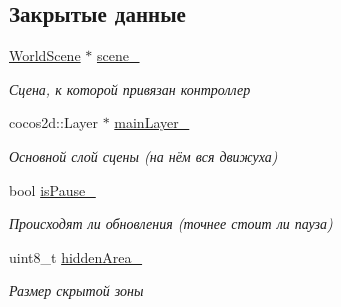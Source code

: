 \subsection*{Закрытые данные}
\begin{DoxyCompactItemize}
\item 
\mbox{\label{classrtm_1_1_world_controller_ae40cf27e88b9916d7b3d2cac35c0dcf8}} 
\hyperlink{classrtm_1_1_world_scene}{World\+Scene} $\ast$ \hyperlink{classrtm_1_1_world_controller_ae40cf27e88b9916d7b3d2cac35c0dcf8}{scene\+\_\+}
\begin{DoxyCompactList}\small\item\em Сцена, к которой привязан контроллер \end{DoxyCompactList}\item 
\mbox{\label{classrtm_1_1_world_controller_a3ef20fc54308d60f9700525dd79efa41}} 
cocos2d\+::\+Layer $\ast$ \hyperlink{classrtm_1_1_world_controller_a3ef20fc54308d60f9700525dd79efa41}{main\+Layer\+\_\+}
\begin{DoxyCompactList}\small\item\em Основной слой сцены (на нём вся движуха) \end{DoxyCompactList}\item 
\mbox{\label{classrtm_1_1_world_controller_ac87ad7a14e099eb1234ca09bc0bd6c21}} 
bool \hyperlink{classrtm_1_1_world_controller_ac87ad7a14e099eb1234ca09bc0bd6c21}{is\+Pause\+\_\+}
\begin{DoxyCompactList}\small\item\em Происходят ли обновления (точнее стоит ли пауза) \end{DoxyCompactList}\item 
\mbox{\label{classrtm_1_1_world_controller_ae1a38ec061ab1a7957c627a3bba63469}} 
uint8\+\_\+t \hyperlink{classrtm_1_1_world_controller_ae1a38ec061ab1a7957c627a3bba63469}{hidden\+Area\+\_\+}
\begin{DoxyCompactList}\small\item\em Размер скрытой зоны \end{DoxyCompactList}\item 
\mbox{\label{classrtm_1_1_world_controller_a7bfc27a0522b00d935d876cecba22462}} 

\end{DoxyCompactItemize}
